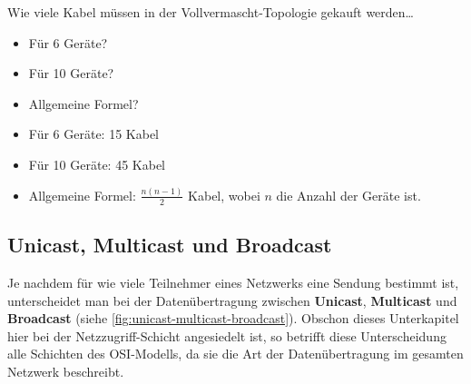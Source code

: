 \begin{myexercise}
	Wie viele Kabel müssen in der Vollvermascht-Topologie gekauft werden\dots
	\begin{itemize}
		\item Für 6 Geräte?
		\item Für 10 Geräte?
		\item Allgemeine Formel?
	\end{itemize}
	\begin{myanswer}
		\begin{itemize}
			\item Für 6 Geräte: 15 Kabel
			\item Für 10 Geräte: 45 Kabel
			\item Allgemeine Formel: $\frac{n(n-1)}{2}$ Kabel, wobei $n$ die Anzahl der Geräte ist.
		\end{itemize}
	\end{myanswer}
\end{myexercise}

\subsection{Unicast, Multicast und Broadcast}
Je nachdem für wie viele Teilnehmer eines Netzwerks eine Sendung bestimmt ist, unterscheidet man bei der Datenübertragung zwischen \textbf{Unicast}, \textbf{Multicast} und \textbf{Broadcast} (siehe \cref{fig:unicast-multicast-broadcast}). Obschon dieses Unterkapitel hier bei der Netzzugriff-Schicht angesiedelt ist, so betrifft diese Unterscheidung alle Schichten des OSI-Modells, da sie die Art der Datenübertragung im gesamten Netzwerk beschreibt.


